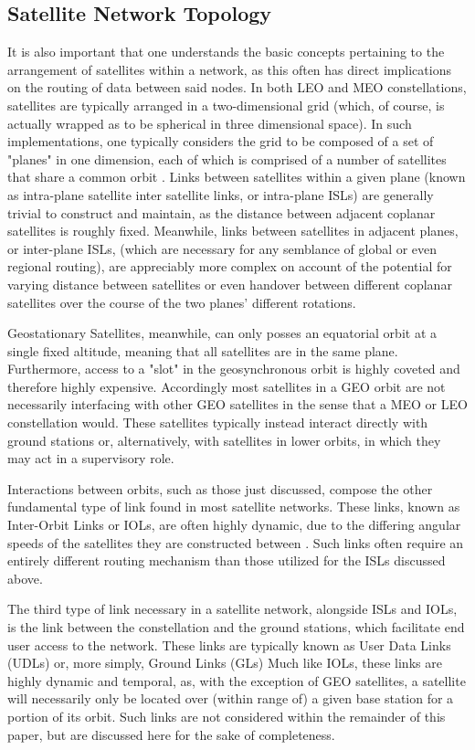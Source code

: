 \subsection{Satellite Network Topology}\label{subsec:satelliteNetworkTopology}
It is also important that one understands the basic concepts pertaining to the arrangement of satellites within a network, as this often has direct implications on the routing of data between said nodes. In both LEO and MEO constellations, satellites are typically arranged in a two-dimensional grid (which, of course, is actually wrapped as to be spherical in three dimensional space). In such implementations, one typically considers the grid to be composed of a set of "planes" in one dimension, each of which is comprised of a number of satellites that share a common orbit \cite{xiaogang_survey_2016}. Links between satellites within a given plane (known as intra-plane satellite inter satellite links, or intra-plane ISLs) are generally trivial to construct and maintain, as the distance between adjacent coplanar satellites is roughly fixed. Meanwhile, links between satellites in adjacent planes, or inter-plane ISLs, (which are necessary for any semblance of global or even regional routing), are appreciably more complex on account of the potential for varying distance between satellites or even handover between different coplanar satellites over the course of the two planes' different rotations.

Geostationary Satellites, meanwhile, can only posses an equatorial orbit at a single fixed altitude, meaning that all satellites are in the same plane. Furthermore, access to a "slot" in the geosynchronous orbit is highly coveted and therefore highly expensive. Accordingly most satellites in a GEO orbit are not necessarily interfacing with other GEO satellites in the sense that a MEO or LEO constellation would. These satellites typically instead interact directly with ground stations or, alternatively, with satellites in lower orbits, in which they may act in a supervisory role.

Interactions between orbits, such as those just discussed, compose the other fundamental type of link found in most satellite networks. These links, known as Inter-Orbit Links or IOLs, are often highly dynamic, due to the differing angular speeds of the satellites they are constructed between \cite{xiaogang_survey_2016}. Such links often require an entirely different routing mechanism than those utilized for the ISLs discussed above.

The third type of link necessary in a satellite network, alongside ISLs and IOLs, is the link between the constellation and the ground stations, which facilitate end user access to the network. These links are typically known as User Data Links (UDLs) or, more simply, Ground Links (GLs) \cite{xiaogang_survey_2016} Much like IOLs, these links are highly dynamic and temporal, as, with the exception of GEO satellites, a satellite will necessarily only be located over (within range of) a given base station for a portion of its orbit. Such links are not considered within the remainder of this paper, but are discussed here for the sake of completeness.